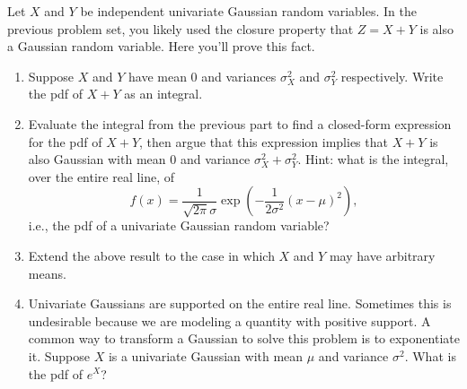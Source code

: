 \documentclass[submit]{harvardml}
\begin{document}
\begin{problem}
  Let $X$ and $Y$ be independent univariate Gaussian random
 variables. In the previous problem set, you likely used the closure property that $Z = X + Y$ is also a Gaussian random variable. Here you'll prove this fact.
\begin{enumerate}[label=(\alph*)]
\item Suppose $X$ and $Y$ have mean 0 and variances $\sigma_X^2$ and $\sigma_Y^2$ respectively. Write the pdf of $X + Y$ as an integral.
\item Evaluate the integral from the previous part to find a closed-form expression for the pdf of $X+Y$, then argue that this expression implies that $X+Y$ is also Gaussian with mean $0$ and variance $\sigma_X^2 + \sigma_Y^2$. Hint: what is the integral, over the entire real line, of
\[
f(x) = \frac{1}{\sqrt{2\pi}\sigma} \exp\left( -\frac{1}{2\sigma^2}(x - \mu)^2 \right) ,
\] i.e., the pdf of a univariate Gaussian random variable?
\item Extend the above result to the case in which $X$ and $Y$ may have arbitrary means.
\item Univariate Gaussians are supported on the entire real line. Sometimes this is undesirable because we are modeling a quantity with positive support. A common way to transform a Gaussian to solve this problem is to exponentiate it. Suppose $X$ is a univariate Gaussian with mean $\mu$ and variance $\sigma^2$. What is the pdf of $e^X$?
\end{enumerate}
\vspace{0.1cm}
\end{problem}
\end{document}
